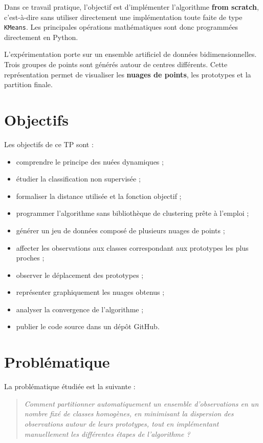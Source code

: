 \documentclass[12pt,a4paper]{article}
\begin{document}
Dans ce travail pratique, l'objectif est d'implémenter l'algorithme \textbf{from scratch}, c'est-à-dire sans utiliser directement une implémentation toute faite de type \texttt{KMeans}. Les principales opérations mathématiques sont donc programmées directement en Python.

L'expérimentation porte sur un ensemble artificiel de données bidimensionnelles. Trois groupes de points sont générés autour de centres différents. Cette représentation permet de visualiser les \textbf{nuages de points}, les prototypes et la partition finale.

\section{Objectifs}

Les objectifs de ce TP sont :

\begin{itemize}
    \item comprendre le principe des nuées dynamiques ;
    \item étudier la classification non supervisée ;
    \item formaliser la distance utilisée et la fonction objectif ;
    \item programmer l'algorithme sans bibliothèque de clustering prête à l'emploi ;
    \item générer un jeu de données composé de plusieurs nuages de points ;
    \item affecter les observations aux classes correspondant aux prototypes les plus proches ;
    \item observer le déplacement des prototypes ;
    \item représenter graphiquement les nuages obtenus ;
    \item analyser la convergence de l'algorithme ;
    \item publier le code source dans un dépôt GitHub.
\end{itemize}

\section{Problématique}

La problématique étudiée est la suivante :

\begin{quote}
\textit{Comment partitionner automatiquement un ensemble d'observations en un nombre fixé de classes homogènes, en minimisant la dispersion des observations autour de leurs prototypes, tout en implémentant manuellement les différentes étapes de l'algorithme ?}
\end{quote}
\end{document}
